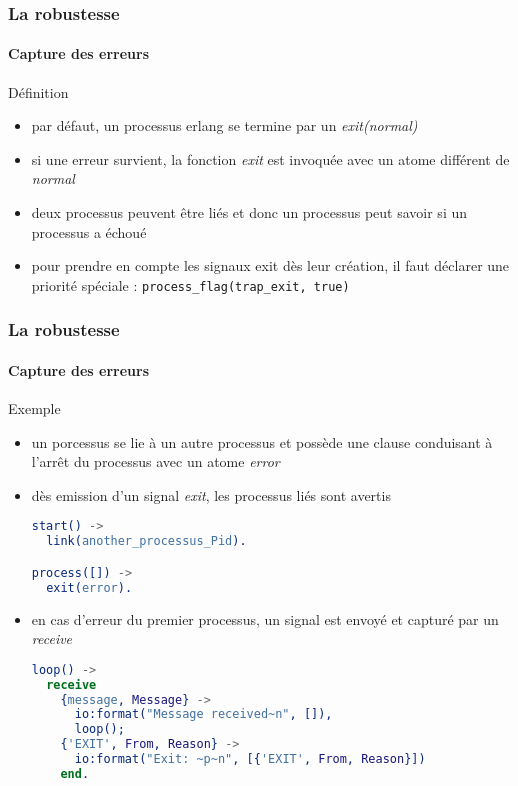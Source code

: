 \begin{frame}[fragile]
  \frametitle{La robustesse}
  \framesubtitle{Capture des erreurs}

  \begin{block}{Définition}
    \begin{itemize}
    \item par défaut, un processus erlang se termine par un
      \textit{exit(normal)}
    \item si une erreur survient, la fonction \textit{exit} est invoquée avec
      un atome différent de \textit{normal}
    \item deux processus peuvent être liés et donc un processus peut savoir si
      un processus a échoué
    \item pour prendre en compte les signaux exit dès leur création, il faut
      déclarer une priorité spéciale : \texttt{process\_flag(trap\_exit, true)}
    \end{itemize}
  \end{block}

\end{frame}

\begin{frame}[fragile]
  \frametitle{La robustesse}
  \framesubtitle{Capture des erreurs}

  \begin{exampleblock}{Exemple}
    \begin{itemize}
    \item un porcessus se lie à un autre processus et possède une clause
      conduisant à l'arrêt du processus avec un atome \textit{error}
    \item dès emission d'un signal \textit{exit}, les processus liés sont
      avertis
      \begin{lstlisting}[language=erlang]
start() ->
  link(another_processus_Pid).

process([]) ->
  exit(error).
      \end{lstlisting}
    \item en cas d'erreur du premier processus, un signal est envoyé et capturé
      par un \textit{receive}
      \begin{lstlisting}[language=erlang]
loop() ->
  receive
    {message, Message} ->
      io:format("Message received~n", []),
      loop();
    {'EXIT', From, Reason} ->
      io:format("Exit: ~p~n", [{'EXIT', From, Reason}])
    end.
      \end{lstlisting}
    \end{itemize}
  \end{exampleblock}

\end{frame}
